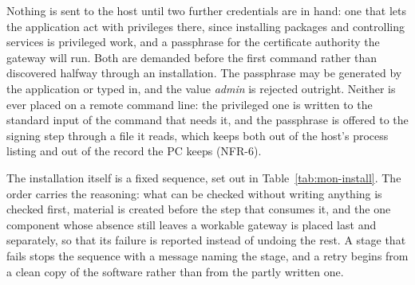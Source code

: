 \documentclass[12pt,a4paper]{report}
\begin{document}
Nothing is sent to the host until two further credentials are in hand:
one that lets the application act with privileges there, since
installing packages and controlling services is privileged work, and a
passphrase for the certificate authority the gateway will run. Both
are demanded before the first command rather than discovered halfway
through an installation. The passphrase may be generated by the
application or typed in, and the value \emph{admin} is rejected
outright. Neither is ever placed on a remote command line: the
privileged one is written to the standard input of the command that
needs it, and the passphrase is offered to the signing step through a
file it reads, which keeps both out of the host's process listing and
out of the record the PC keeps (NFR-6).

The installation itself is a fixed sequence, set out in
Table~\ref{tab:mon-install}. The order carries the reasoning: what can
be checked without writing anything is checked first, material is
created before the step that consumes it, and the one component whose
absence still leaves a workable gateway is placed last and separately,
so that its failure is reported instead of undoing the rest. A stage
that fails stops the sequence with a message naming the stage, and a
retry begins from a clean copy of the software rather than from the
partly written one.
\end{document}
